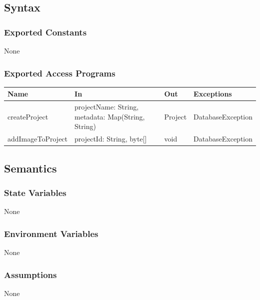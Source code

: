 \documentclass[12pt, titlepage]{article}
\begin{document}
    \subsection{Syntax}
    \subsubsection{Exported Constants}
        None

    \subsubsection{Exported Access Programs}
    \begin{center}\begin{tabular}{p{3cm} p{4cm} p{3cm} p{3cm}}
    \hline\textbf{Name} & \textbf{In} & \textbf{Out} & \textbf{Exceptions} \\
    \hline
        createProject & projectName: String, metadata: Map(String, String) & Project & DatabaseException \\
        addImageToProject & projectId: String, byte[] & void & DatabaseException \\
    \hline
    \end{tabular}\end{center}

    \subsection{Semantics}
    \subsubsection{State Variables}
        None

    \subsubsection{Environment Variables}
        None

    \subsubsection{Assumptions}
        None
\end{document}

